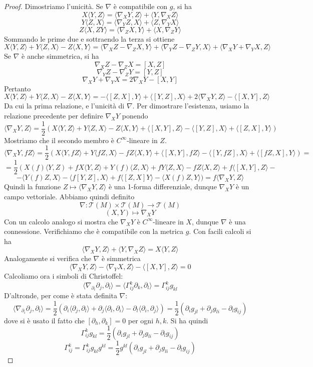 \documentclass[a4paper,11pt]{article}
\theoremstyle{definition}
\theoremstyle{theorem}
\newcommand{\T}{\mathcal{T}}
\begin{document}
\begin{proof}
	Dimostriamo l'unicità. Se $\nabla$ è compatibile con $g$, si ha
	\[X\langle Y,Z\rangle=\langle\nabla_XY,Z\rangle+\langle Y,\nabla_XZ\rangle\]
	\[Y\langle Z,X\rangle=\langle\nabla_YZ,X\rangle+\langle Z,\nabla_YX\rangle\]
	\[Z\langle X,ZY\rangle=\langle\nabla_ZX,Y\rangle+\langle X,\nabla_ZY\rangle\]
	Sommando le prime due e sottraendo la terza si ottiene
	\[X\langle Y,Z\rangle+Y\langle Z,X\rangle-Z\langle X,Y\rangle=\langle\nabla_XZ-\nabla_ZX,Y\rangle+\langle\nabla_YZ-\nabla_ZY,X\rangle+\langle\nabla_XY+\nabla_YX,Z\rangle\]
	Se $\nabla$ è anche simmetrica, si ha
	\[\nabla_XZ-\nabla_ZX=[X,Z]\]
	\[\nabla_YZ-\nabla_ZY=[Y,Z]\]
	\[\nabla_XY+\nabla_YX=2\nabla_XY-[X,Y]\]
	Pertanto
	\[X\langle Y,Z\rangle+Y\langle Z,X\rangle-Z\langle X,Y\rangle=-\langle[Z,X],Y\rangle+\langle[Y,Z],X\rangle+2\langle\nabla_XY,Z\rangle-\langle[X,Y],Z\rangle\]
	Da cui la prima relazione, e l'unicità di $\nabla$. Per dimostrare l'esistenza, usiamo la relazione precedente per definire $\nabla_XY$ ponendo
	\[\langle\nabla_XY,Z\rangle=\frac{1}{2}\left(X\langle Y,Z\rangle+Y\langle Z,X\rangle-Z\langle X,Y\rangle+\langle[X,Y],Z\rangle-\langle[Y,Z],X\rangle+\langle[Z,X],Y\rangle\right)\]
	Mostriamo che il secondo membro è $C^\infty$-lineare in $Z$.
	\[\langle\nabla_XY,fZ\rangle=\frac{1}{2}\left(X\langle Y,fZ\rangle+Y\langle fZ,X\rangle-fZ\langle X,Y\rangle+\langle[X,Y],fZ\rangle-\langle[Y,fZ],X\rangle+\langle[fZ,X],Y\rangle\right)=\]\[=\frac{1}{2}\left(X(f)\langle Y,Z\right)+fX\langle Y,Z\rangle+Y(f)\langle Z,X\rangle+fY\langle Z,X\rangle-fZ\langle X,Z\rangle+f\langle[X,Y],Z\rangle-\]\[-\langle Y(f)Z,X\rangle-\langle f[Y,Z],X\rangle+f\langle[Z,X]Y\rangle-\langle X(f)Z,Y\rangle)=f\langle\nabla_XY,Z\rangle\]
	Quindi la funzione $Z\mapsto\langle\nabla_XY,Z\rangle$ è una 1-forma differenziale, dunque $\nabla_XY$ è un campo vettoriale. Abbiamo quindi definito
	\[\nabla\colon\T(M)\times\T(M)\to\T(M)\]
	\[(X,Y)\mapsto\nabla_XY\]
	Con un calcolo analogo si mostra che $\nabla_XY$ è $C^\infty$-lineare in $X$, dunque $\nabla$ è una connessione. Verifichiamo che è compatibile con la metrica $g$. Con facili calcoli si ha
	\[\langle\nabla_XY,Z\rangle+\langle Y,\nabla_XZ\rangle=X\langle Y,Z\rangle\]
	Analogamente si verifica che $\nabla$ è simmetrica
	\[\langle\nabla_XY,Z\rangle-\langle\nabla_YX,Z\rangle-\langle[X,Y],Z\rangle=0\]
	Calcoliamo ora i simboli di Christoffel:
	\[\langle\nabla_{\partial_i}\partial_j,\partial_l\rangle=\langle\Gamma^k_{ij}\partial_k,\partial_l\rangle=\Gamma^k_{ij}g_{kl}\]
	D'altronde, per come è stata definita $\nabla$:
	\[\langle\nabla_{\partial_i}\partial_j,\partial_l\rangle=\frac{1}{2}\left(\partial_i\langle\partial_j,\partial_l\rangle+\partial_j\langle\partial_l,\partial_i\rangle-\partial_l\langle\partial_i,\partial_j\rangle\right)=\frac{1}{2}\left(\partial_ig_{jl}+\partial_jg_{li}-\partial_lg_{ij}\right)\]
	dove si è usato il fatto che $[\partial_h,\partial_k]=0$ per ogni $h,k$.
	Si ha quindi
	\[\Gamma^k_{ij}g_{kl}=\frac{1}{2}\left(\partial_ig_{jl}+\partial_jg_{li}-\partial_lg_{ij}\right)\]
	\[\Gamma^k_{ij}=\Gamma^k_{ij}g_{kl}g^{kl}=\frac{1}{2}g^{kl}\left(\partial_ig_{jl}+\partial_jg_{li}-\partial_lg_{ij}\right)\]
\end{proof}
\end{document}
